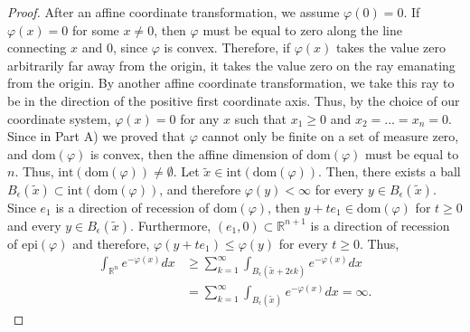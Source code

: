 \documentclass{amsart}
\theoremstyle{lemma}
\theoremstyle{remark}
\begin{document}
\begin{proof}
After an affine coordinate transformation, we assume $\varphi(0) = 0$. If $\varphi(x) = 0$ for some $x \neq 0$, then $\varphi$ must be equal to zero along the line connecting $x$ and $0$, since $\varphi$ is convex. Therefore, if $\varphi(x)$ takes the value zero arbitrarily far away from the origin, it takes the value zero on the ray emanating from the origin. By another affine coordinate transformation, we take this ray to be in the direction of the positive first coordinate axis. Thus, by the choice of our coordinate system, $\varphi(x)=0$ for any $x$ such that $x_1 \geq 0$ and $x_2 = \dots = x_n = 0$. Since in Part A) we proved that $\varphi$ cannot only be finite on a set of measure zero, and $\text{dom}(\varphi)$ is convex, then the affine dimension of $\text{dom}(\varphi)$ must be equal to $n$. Thus, $\text{int}(\text{dom}(\varphi)) \neq \emptyset$. Let $\tilde{x} \in \text{int}(\text{dom}(\varphi))$. Then, there exists a ball $B_{\epsilon}(\tilde{x}) \subset \text{int}(\text{dom}(\varphi))$, and therefore $\varphi(y) <\infty$ for every $y \in B_{\epsilon}(\tilde{x})$. Since $e_1$ is a direction of recession of $\text{dom}(\varphi)$, then $y + te_1 \in \text{dom}(\varphi)$ for $t\geq 0$ and every $y \in B_{\epsilon}(\tilde{x})$. Furthermore, $(e_1, 0) \subset \mathbb{R}^{n+1}$ is a direction of recession of $\text{epi}(\varphi)$ and therefore, $\varphi(y + t e_1) \leq \varphi(y)$ for every $t \geq 0$.  Thus,
\begin{align}
\int_{\mathbb{R}^n} e^{-\varphi(x)}dx &\geq \sum_{k=1}^{\infty} \int_{B_{\epsilon}(\tilde{x} + 2 \epsilon k)} e^{-\varphi(x)}dx \\
&=\sum_{k=1}^{\infty} \int_{B_{\epsilon}(\tilde{x})} e^{-\varphi(x)}dx = \infty.
\end{align}


\end{proof}
\end{document}
